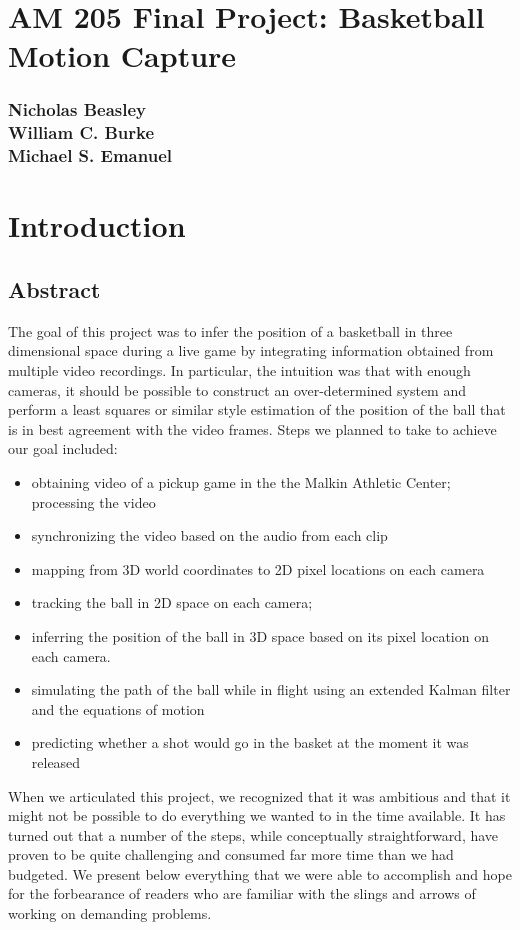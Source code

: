 \documentclass{article}
\begin{document}
\section*{AM 205 Final Project: Basketball Motion Capture}
\subsubsection*{
Nicholas Beasley\\
William C. Burke\\
Michael S. Emanuel}

\section{Introduction}
\subsection{Abstract}
The goal of this project was to infer the position of a basketball in three dimensional space during a live game by 
integrating information obtained from multiple video recordings.
In particular, the intuition was that with enough cameras, it should be possible to construct an over-determined system and perform 
a least squares or similar style estimation of the position of the ball that is in best agreement with the video frames.
Steps we planned to take to achieve our goal included:
\begin{itemize}
\item obtaining video of a pickup game in the the Malkin Athletic Center; processing the video
\item synchronizing the video based on the audio from each clip
\item mapping from 3D world coordinates to 2D pixel locations on each camera
\item tracking the ball in 2D space on each camera; 
\item inferring the position of the ball in 3D space based on its pixel location on each camera.
\item simulating the path of the ball while in flight using an extended Kalman filter and the equations of motion
\item predicting whether a shot would go in the basket at the moment it was released
\end{itemize}

When we articulated this project, we recognized that it was ambitious and that it might not be possible to do everything we wanted to
in the time available.  It has turned out that a number of the steps, while conceptually straightforward, have proven to be quite
challenging and consumed far more time than we had budgeted.  We present below everything that we were able
to accomplish and hope for the forbearance of readers who are familiar with the slings and arrows of working on demanding problems.
\end{document}
